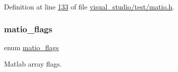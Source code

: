 Definition at line \hyperlink{visual__studio_2test_2matio_8h_source_l00133}{133} of file \hyperlink{visual__studio_2test_2matio_8h_source}{visual\+\_\+studio/test/matio.\+h}.

\mbox{\label{group___m_a_t_gab9d6ef9e3ddca78a317b173f01d53fbb}} 
\subsubsection{\texorpdfstring{matio\+\_\+flags}{matio\_flags}\hspace{0.1cm}{\footnotesize\ttfamily [2/2]}}
{\footnotesize\ttfamily enum \hyperlink{group___m_a_t_gab9d6ef9e3ddca78a317b173f01d53fbb}{matio\+\_\+flags}}



Matlab array flags. 

